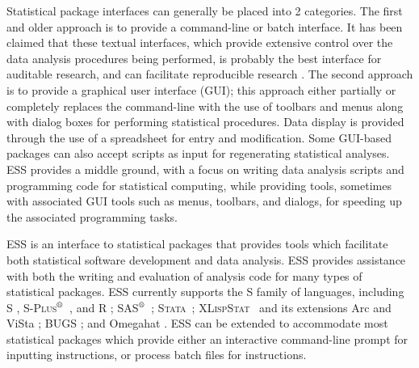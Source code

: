 \documentclass{article}
\newcommand*{\regstrd}{$^{\mbox{\scriptsize{\textregistered}}}$}
\newcommand*{\SAS}{\textsc{SAS}}
\newcommand*{\Splus}{\textsc{S-Plus}}
\newcommand*{\XLispStat}{\textsc{XLispStat}}
\newcommand*{\Stata}{\textsc{Stata}}
\begin{document}






Statistical package interfaces can generally be placed into 2
categories.  The first and older approach is to provide a command-line
or batch interface.  It has been claimed that these textual
interfaces, which provide extensive control over the data analysis
procedures being performed, is probably the best interface for
auditable research, and can facilitate reproducible research
\citep{claer:1997}.  The second approach is to provide a graphical
user interface (GUI); this approach either partially or completely
replaces the command-line with the use of toolbars and menus along
with dialog boxes for performing statistical procedures.  Data display
is provided through the use of a spreadsheet for entry and
modification.  Some GUI-based packages can also accept
scripts as input for regenerating statistical analyses.  ESS provides
a middle ground, with a focus on writing data analysis scripts and
programming code for statistical computing, while providing tools,
sometimes with associated GUI tools such as menus, toolbars, and
dialogs, for speeding up the associated programming tasks.

ESS is an interface to statistical packages that provides tools which
facilitate both statistical software development and data analysis.
ESS provides assistance with both the writing and evaluation of
analysis code for many types of statistical packages.  ESS currently
supports the S family of languages, including S
\citep{BecRCW88,ChaJH92,ChaJ98}, \Splus\regstrd\ \citep{Splus}, and R
\citep{ihak:gent:1996,R}; \SAS\regstrd\ \citep{SAS:8}; \Stata\
\citep{Stata:7.0}; \XLispStat\ \citep{Tier90} and its extensions Arc
\citep{Cook:Weisberg:1999} and ViSta \citep{youn:fald:mcfa:1992}; BUGS
\citep{BUGS}; and Omegahat \citep{DTLang:2000}.  ESS can be extended
to accommodate most statistical packages which provide either an
interactive command-line prompt for inputting instructions, or process
batch files for instructions.
\end{document}
